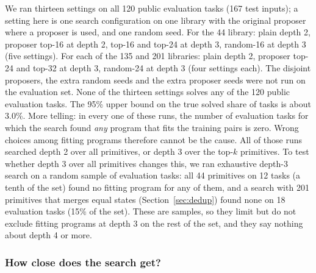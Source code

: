 \documentclass[sigconf,nonacm]{acmart}
\begin{document}
We ran thirteen settings on all 120 public evaluation tasks (167 test inputs); a setting here is one search configuration on one library with the original proposer where a proposer is used, and one random seed. For the 44 library: plain depth 2, proposer top-16 at depth 2, top-16 and top-24 at depth 3, random-16 at depth 3 (five settings). For each of the 135 and 201 libraries: plain depth 2, proposer top-24 and top-32 at depth 3, random-24 at depth 3 (four settings each). The disjoint proposers, the extra random seeds and the extra proposer seeds were not run on the evaluation set. None of the thirteen settings solves any of the 120 public evaluation tasks. The 95\% upper bound on the true solved share of tasks is about 3.0\%. More telling: in every one of these runs, the number of evaluation tasks for which the search found \emph{any} program that fits the training pairs is zero. Wrong choices among fitting programs therefore cannot be the cause. All of those runs searched depth 2 over all primitives, or depth 3 over the top-$k$ primitives. To test whether depth 3 over all primitives changes this, we ran exhaustive depth-3 search on a random sample of evaluation tasks: all 44 primitives on 12 tasks (a tenth of the set) found no fitting program for any of them, and a search with 201 primitives that merges equal states (Section~\ref{sec:dedup}) found none on 18 evaluation tasks (15\% of the set). These are samples, so they limit but do not exclude fitting programs at depth 3 on the rest of the set, and they say nothing about depth 4 or more.

\subsubsection{How close does the search get?}



\begin{table}[t]
\caption{Diagnostic with the 201-primitive library, programs of depth up to 2, no colour map. Columns: the random 300 training tasks split by whether plain depth-2 search solved them, and the 120 evaluation tasks. Same size: output has the input's size. Shape ok: some program has the right output size on every training pair. Best match: median over those tasks of the best share of matching cells (all cells, or only cells that are not background in the target or the prediction). Copy match: the same for copying the input, on same-size tasks. Gain $>5$: same-size tasks where the best program beats copying by more than five points.}
\label{tab:diag}
\footnotesize\setlength{\tabcolsep}{4pt}

\end{table}
\end{document}
